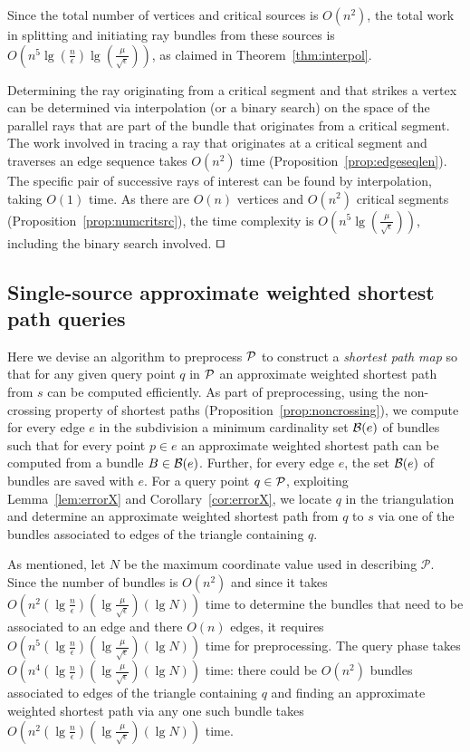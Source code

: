 \documentclass[11pt]{article}
\def\qed{\hbox{\rlap{$\sqcap$}$\sqcup$}}
\def\calP{\mathcal{P}}
\newenvironment{proof}{\par\noindent{\bf Proof:}}{\mbox{}\hfill$\qed$\\}
\begin{document}
\begin{proof}
Since the total number of vertices and critical sources is $O(n^2)$, the total work in splitting and initiating ray bundles from these sources is $O(n^5 \lg (\frac{n}{\epsilon}) \lg (\frac{\mu}{\sqrt{\epsilon}}))$, as claimed in Theorem~\ref{thm:interpol}.

Determining the ray originating from a critical segment and that strikes  a vertex can be determined via interpolation (or a binary search) on the space of the parallel rays that are part of the bundle that originates from a  critical segment.
The work involved in tracing a ray that originates at a critical segment and traverses an edge sequence takes $O(n^2)$ time (Proposition~\ref{prop:edgeseqlen}).
The specific pair of successive rays of interest can be found by interpolation, taking $O(1)$ time.
As there are $O(n)$ vertices and $O(n^2)$ critical segments (Proposition~\ref{prop:numcritsrc}), the time complexity is $O(n^5\lg(\frac{\mu}{\sqrt{\epsilon}}))$, including the binary search involved.
\end{proof}

\subsection*{Single-source approximate weighted shortest path queries}
\label{subsect:sssp}

Here we devise an algorithm to preprocess $\cal{P}$ to construct a {\it shortest path map} so that for any given query point $q$ in $\cal{P}$ an approximate weighted shortest path from $s$ can be computed efficiently.
As part of preprocessing, using the non-crossing property of shortest paths (Proposition~\ref{prop:noncrossing}), we compute for every edge $e$ in the subdivision a minimum cardinality set ${\cal B}(e)$ of bundles such that for every point $p \in e$ an approximate weighted shortest path can be computed from a bundle $B \in {\cal B}(e)$.
Further, for every edge $e$, the set ${\cal B}(e)$ of bundles are saved with $e$.
For a query point $q \in {\cal P}$, exploiting Lemma~\ref{lem:errorX} and Corollary~\ref{cor:errorX}, we locate $q$ in the triangulation and determine an approximate weighted shortest path from $q$ to $s$ via one of the bundles associated to edges of the triangle containing $q$.

As mentioned, let $N$ be the maximum coordinate value used in describing $\calP$.
Since the number of bundles is $O(n^2)$ and since it takes $O(n^2  (\lg{\frac{n}{\epsilon}})(\lg{\frac{\mu}{\sqrt{\epsilon}}}) (\lg{N}))$ time to determine the bundles that need to be associated to an edge and there $O(n)$ edges, it requires $O(n^5 (\lg{\frac{n}{\epsilon}}) (\lg{\frac{\mu}{\sqrt{\epsilon}}})(\lg{N}))$ time for preprocessing.
The query phase takes $O(n^4 (\lg{\frac{n}{\epsilon}})( \lg{\frac{\mu}{\sqrt{\epsilon}}})(\lg{N}))$ time: there could be $O(n^2)$ bundles associated to edges of the triangle containing $q$ and finding an approximate weighted shortest path via any one such bundle takes $O(n^2(\lg{\frac{n}{\epsilon}})(\lg{\frac{\mu}{\sqrt{\epsilon}}})(\lg{N}))$ time.
\end{document}
